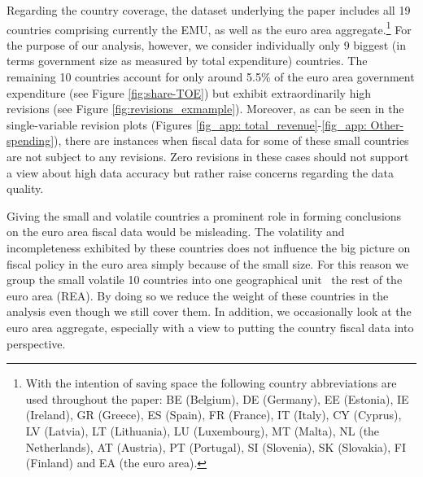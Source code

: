 Regarding the country coverage, the dataset underlying the paper includes all 19 countries comprising currently the EMU, as well as the euro
area aggregate.\footnote{With the intention of saving space the following country abbreviations are used throughout the paper: BE (Belgium), DE (Germany), EE (Estonia), IE (Ireland), GR (Greece), ES (Spain), FR (France), IT (Italy), CY (Cyprus), LV (Latvia), LT (Lithuania), LU (Luxembourg), MT (Malta), NL (the Netherlands), AT (Austria), PT (Portugal), SI (Slovenia), SK (Slovakia), FI (Finland) and EA (the euro area).} For the purpose of our analysis, however, we consider individually only 9 biggest (in terms government size as measured by total expenditure) countries. The remaining 10 countries account for only around 5.5\% of the euro area government expenditure (see Figure \ref{fig:share-TOE}) but exhibit extraordinarily high revisions (see Figure \ref{fig:revisions_exmample}). Moreover, as can be seen in the single-variable revision plots (Figures \ref{fig_app: total_revenue}-\ref{fig_app: Other-spending}), there are instances when fiscal data for some of these small countries are not subject to any revisions. Zero revisions in these cases should not support a view about high data accuracy but rather raise concerns regarding the data quality. 

Giving the small and volatile countries a prominent role in forming conclusions on the euro area fiscal data would be misleading. The volatility and incompleteness exhibited by these countries does not influence the big picture on fiscal policy in the euro area simply because of the small size. For this reason we group the small volatile 10 countries into one geographical unit \textemdash~the rest of the euro area (REA). By doing so we reduce the weight of these countries in the analysis even though we still cover them. In addition, we occasionally look at the euro area aggregate, especially with a view to putting the country fiscal data into perspective.

% 

